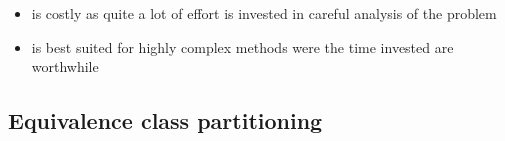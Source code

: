 \documentclass[11pt]{article}
\providecommand{\tightlist}{%
      \setlength{\itemsep}{0pt}\setlength{\parskip}{0pt}}
\begin{document}
\begin{itemize}
\begin{itemize}
    \begin{itemize}
    \tightlist
    \item
      is costly as quite a lot of effort is invested in careful analysis
      of the problem
    \item
      is best suited for highly complex methods were the time invested
      are worthwhile
    \end{itemize}
  \end{itemize}
\end{itemize}

\hypertarget{equivalence-class-partitioning}{%
\subsection{Equivalence class
partitioning}\label{equivalence-class-partitioning}}
\end{document}
